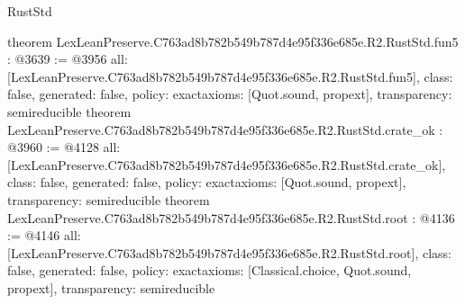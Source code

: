 \begin{lexlean}{RustStd}
\begin{coremodule}
{}
theorem LexLeanPreserve.C763ad8b782b549b787d4e95f336e685e.R2.RustStd.fun5 : @3639 := @3956 {
  all: [LexLeanPreserve.C763ad8b782b549b787d4e95f336e685e.R2.RustStd.fun5],
  class: false,
  generated: false,
  policy: exact{axioms: [Quot.sound, propext]},
  transparency: semireducible
}
theorem LexLeanPreserve.C763ad8b782b549b787d4e95f336e685e.R2.RustStd.crate_ok : @3960 := @4128 {
  all: [LexLeanPreserve.C763ad8b782b549b787d4e95f336e685e.R2.RustStd.crate_ok],
  class: false,
  generated: false,
  policy: exact{axioms: [Quot.sound, propext]},
  transparency: semireducible
}
theorem LexLeanPreserve.C763ad8b782b549b787d4e95f336e685e.R2.RustStd.root : @4136 := @4146 {
  all: [LexLeanPreserve.C763ad8b782b549b787d4e95f336e685e.R2.RustStd.root],
  class: false,
  generated: false,
  policy: exact{axioms: [Classical.choice, Quot.sound, propext]},
  transparency: semireducible
}


\end{coremodule}
\end{lexlean}

